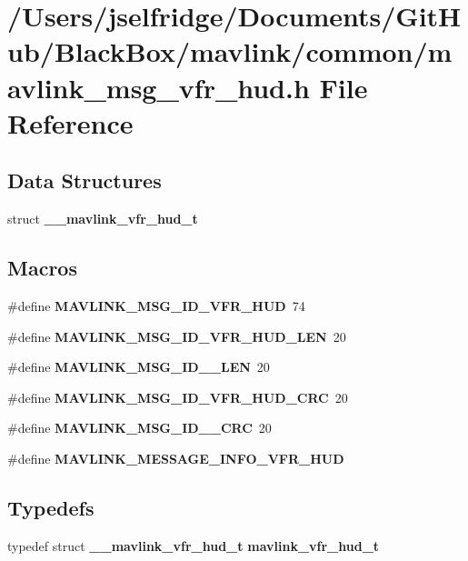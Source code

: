 \section{/\+Users/jselfridge/\+Documents/\+Git\+Hub/\+Black\+Box/mavlink/common/mavlink\+\_\+msg\+\_\+vfr\+\_\+hud.h File Reference}
\label{mavlink__msg__vfr__hud_8h}
\subsection*{Data Structures}
\begin{DoxyCompactItemize}
\item 
struct \textbf{ \+\_\+\+\_\+mavlink\+\_\+vfr\+\_\+hud\+\_\+t}
\end{DoxyCompactItemize}
\subsection*{Macros}
\begin{DoxyCompactItemize}
\item 
\#define \textbf{ M\+A\+V\+L\+I\+N\+K\+\_\+\+M\+S\+G\+\_\+\+I\+D\+\_\+\+V\+F\+R\+\_\+\+H\+UD}~74
\item 
\#define \textbf{ M\+A\+V\+L\+I\+N\+K\+\_\+\+M\+S\+G\+\_\+\+I\+D\+\_\+\+V\+F\+R\+\_\+\+H\+U\+D\+\_\+\+L\+EN}~20
\item 
\#define \textbf{ M\+A\+V\+L\+I\+N\+K\+\_\+\+M\+S\+G\+\_\+\+I\+D\+\_\+\_\+\+L\+EN}~20
\item 
\#define \textbf{ M\+A\+V\+L\+I\+N\+K\+\_\+\+M\+S\+G\+\_\+\+I\+D\+\_\+\+V\+F\+R\+\_\+\+H\+U\+D\+\_\+\+C\+RC}~20
\item 
\#define \textbf{ M\+A\+V\+L\+I\+N\+K\+\_\+\+M\+S\+G\+\_\+\+I\+D\+\_\+\_\+\+C\+RC}~20
\item 
\#define \textbf{ M\+A\+V\+L\+I\+N\+K\+\_\+\+M\+E\+S\+S\+A\+G\+E\+\_\+\+I\+N\+F\+O\+\_\+\+V\+F\+R\+\_\+\+H\+UD}
\end{DoxyCompactItemize}
\subsection*{Typedefs}
\begin{DoxyCompactItemize}
\item 
typedef struct \textbf{ \+\_\+\+\_\+mavlink\+\_\+vfr\+\_\+hud\+\_\+t} \textbf{ mavlink\+\_\+vfr\+\_\+hud\+\_\+t}
\end{DoxyCompactItemize}


